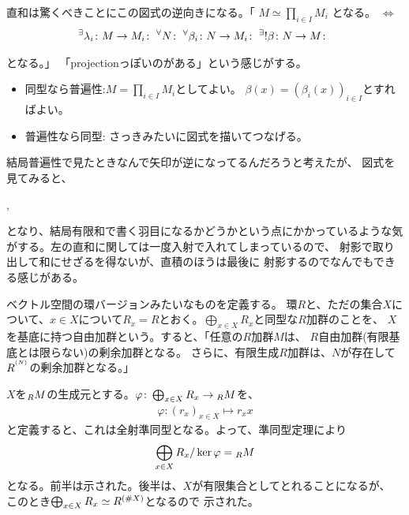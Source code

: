 \documentclass[9pt]{ltjsarticle}
\begin{document}
直和は驚くべきことにこの図式の逆向きになる。「
$M \simeq \prod_{i\in I}M_i$ となる。 $\iff$
\begin{align}
  {}^{\exists}{\lambda_i \colon M \to M_i}\mathrm{\colon\;}
  {}^{\forall}{N}\mathrm{\colon\;}
  {}^{\forall}{\beta_i \colon N \to M_i}\mathrm{\colon\;}
  {}^{\exists}{! \beta\colon N \to M}\mathrm{\colon\;}
\end{align}
\begin{center}
\end{center}
となる。」
「projectionっぽいのがある」という感じがする。
\begin{myproof}
  \begin{itemize}
    \item 同型なら普遍性:$M=\prod_{i\in I}M_i$としてよい。
    $\beta(x) = (\beta_i(x))_{i\in I}$とすればよい。
    \item 普遍性なら同型:
    さっきみたいに図式を描いてつなげる。
  \end{itemize}
\end{myproof}
結局普遍性で見たときなんで矢印が逆になってるんだろうと考えたが、
図式を見てみると、
\begin{center}
  ,\quad
\end{center}
となり、結局有限和で書く羽目になるかどうかという点にかかっているような気がする。左の直和に関しては一度入射で入れてしまっているので、
射影で取り出して和にせざるを得ないが、直積のほうは最後に
射影するのでなんでもできる感じがある。

ベクトル空間の環バージョンみたいなものを定義する。
環$R$と、ただの集合$X$について、$x\in X$について$R_x = R$とおく。$\bigoplus_{x \in X}R_x$と同型な$R$加群のことを、
$X$を基底に持つ自由加群という。すると、「任意の$R$加群$M$は、
$R$自由加群(有限基底とは限らない)の剰余加群となる。
さらに、有限生成$R$加群は、$N$が存在して$R^{^{(N)}}$の剰余加群となる。」
\begin{myproof}
  $X$を${}_{R}M$の生成元とする。$\varphi\colon \bigoplus_{x\in X}R_x \to {}_{R}M$を、
  \begin{align}
    \varphi\colon (r_x)_{x\in X} \mapsto r_x x
  \end{align}
  と定義すると、これは全射準同型となる。よって、準同型定理により
  \begin{align}
    \bigoplus_{x\in X}R_x/ \ker \varphi = {}_{R}M
  \end{align}
  となる。前半は示された。後半は、$X$が有限集合としてとれることになるが、
  このとき$\bigoplus_{x\in X}R_x \simeq R^{(\# X)}$となるので
  示された。
\end{myproof}
\end{document}
